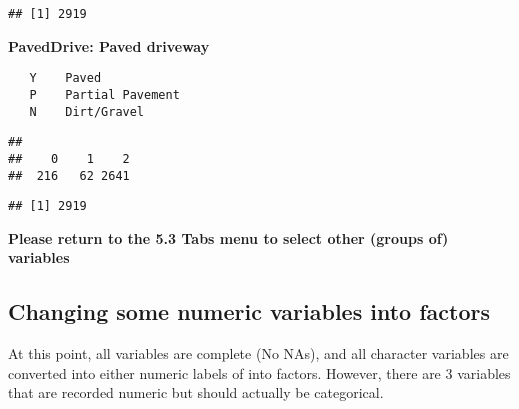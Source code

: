 \documentclass[]{article}
\newenvironment{Shaded}{\begin{snugshade}}{\end{snugshade}}
\newcommand{\KeywordTok}[1]{\textcolor[rgb]{0.13,0.29,0.53}{\textbf{#1}}}
\newcommand{\DecValTok}[1]{\textcolor[rgb]{0.00,0.00,0.81}{#1}}
\newcommand{\StringTok}[1]{\textcolor[rgb]{0.31,0.60,0.02}{#1}}
\newcommand{\CommentTok}[1]{\textcolor[rgb]{0.56,0.35,0.01}{\textit{#1}}}
\newcommand{\OperatorTok}[1]{\textcolor[rgb]{0.81,0.36,0.00}{\textbf{#1}}}
\newcommand{\NormalTok}[1]{#1}
\begin{document}
\begin{verbatim}
## [1] 2919
\end{verbatim}

\textbf{PavedDrive: Paved driveway}

\begin{verbatim}
   Y    Paved 
   P    Partial Pavement
   N    Dirt/Gravel
\end{verbatim}

\begin{Shaded}
\end{Shaded}

\begin{verbatim}
## 
##    0    1    2 
##  216   62 2641
\end{verbatim}

\begin{Shaded}
\end{Shaded}

\begin{verbatim}
## [1] 2919
\end{verbatim}

\textbf{Please return to the 5.3 Tabs menu to select other (groups of)
variables}

\subsection{Changing some numeric variables into
factors}\label{changing-some-numeric-variables-into-factors}

At this point, all variables are complete (No NAs), and all character
variables are converted into either numeric labels of into factors.
However, there are 3 variables that are recorded numeric but should
actually be categorical.
\end{document}
